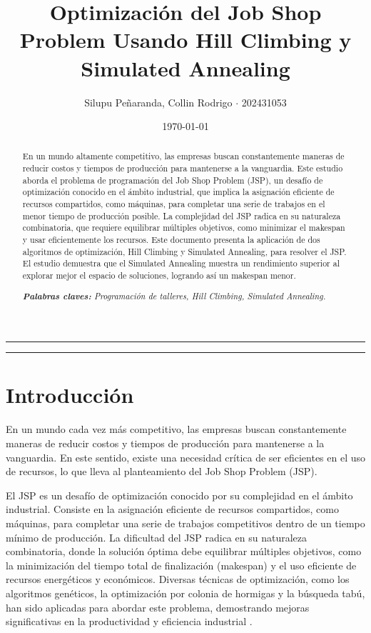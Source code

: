 \documentclass[11pt]{article}
\title{\LARGE\textbf{Optimización del Job Shop Problem Usando Hill Climbing y Simulated Annealing}}
\author{\normalsize{Silupu Peñaranda, Collin Rodrigo $\cdot$ 202431053}}
\date{\small{\today}}
\begin{document}
\renewcommand{\BOthers}[1]{et al.\hbox{}}


\maketitle


\hrule
\begin{abstract}
\noindent %
En un mundo altamente competitivo, las empresas buscan constantemente maneras de reducir costos y tiempos de producción para mantenerse a la vanguardia. Este estudio aborda el problema de programación del Job Shop Problem (JSP), un desafío de optimización conocido en el ámbito industrial, que implica la asignación eficiente de recursos compartidos, como máquinas, para completar una serie de trabajos en el menor tiempo de producción posible. La complejidad del JSP radica en su naturaleza combinatoria, que requiere equilibrar múltiples objetivos, como minimizar el makespan y usar eficientemente los recursos. Este documento presenta la aplicación de dos algoritmos de optimización, Hill Climbing y Simulated Annealing, para resolver el JSP. El estudio demuestra que el Simulated Annealing muestra un rendimiento superior al explorar mejor el espacio de soluciones, logrando así un makespan menor. 

\noindent\textit{\textbf{Palabras claves:} Programación de talleres, Hill Climbing, Simulated Annealing.}

\end{abstract}

\hrule

\section{Introducción}

En un mundo cada vez más competitivo, las empresas buscan constantemente maneras de reducir costos y tiempos de producción para mantenerse a la vanguardia. En este sentido, existe una necesidad crítica de ser eficientes en el uso de recursos, lo que lleva al planteamiento del Job Shop Problem (JSP). 

\vspace{1em}
\noindent El JSP es un desafío de optimización conocido por su complejidad en el ámbito industrial. Consiste en la asignación eficiente de recursos compartidos, como máquinas, para completar una serie de trabajos competitivos dentro de un tiempo mínimo de producción. La dificultad del JSP radica en su naturaleza combinatoria, donde la solución óptima debe equilibrar múltiples objetivos, como la minimización del tiempo total de finalización (makespan) y el uso eficiente de recursos energéticos y económicos. Diversas técnicas de optimización, como los algoritmos genéticos, la optimización por colonia de hormigas y la búsqueda tabú, han sido aplicadas para abordar este problema, demostrando mejoras significativas en la productividad y eficiencia industrial \citep{tamssaouet2021, mokhtari2017, musser1993, yusof2011, scalia2023}.
\end{document}
